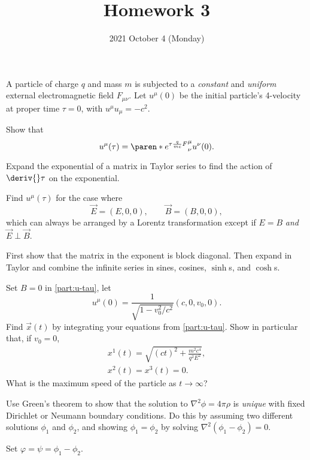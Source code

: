 \documentclass{phys151}
\title{Homework 3}
\date{2021 October 4 (Monday)}
\author{}
\begin{document}
\begin{problem}
  A particle of charge \(q\) and mass \(m\) is subjected to a \emph{constant}
  and \emph{uniform} external electromagnetic field \(F_{\mu \nu}\).  Let
  \(u^\mu(0)\) be the initial particle's 4-velocity at proper time \(\tau =
  0\), with \(u^\mu u_\mu = -c^2\).
  \begin{subproblems}
  \item Show that
    \[
      u^\mu(\tau) = \paren* {e^{\tau \frac q {m c} F}}^\mu_\nu u^\nu(0).
    \]
    \begin{hint}
      Expand the exponential of a matrix in Taylor series to find the action of
      \(\deriv {} \tau\) on the exponential.
    \end{hint}
  \item \label{part:u-tau} Find \(u^\mu(\tau)\) for the case where
    \[
      \vec E = (E, 0, 0), \qquad \vec B = (B, 0, 0),
    \]
    which can always be arranged by a Lorentz transformation except if \(E =
    B\) \emph{and} \(\vec E \perp \vec B\).
    \begin{hint}
      First show that the matrix in the exponent is block diagonal.  Then
      expand in Taylor and combine the infinite series in sines, cosines,
      \(\sinh\)s, and \(\cosh\)s.
    \end{hint}
  \item Set \(B = 0\) in \ref{part:u-tau}, let
    \[
      u^\mu(0) = \frac 1 {\sqrt {1 - v_0^2 / c^2}} (c, 0, v_0, 0).
    \]
    Find \(\vec x(t)\) by integrating your equations from \ref{part:u-tau}.
    Show in particular that, if \(v_0 = 0\),
    \begin{gather*}
      x^1(t) = \sqrt {(ct)^2 + \frac {m^2 c^4} {q^2 E^2}}, \\
      x^2(t) = x^3(t) = 0.
    \end{gather*}
    What is the maximum speed of the particle as \(t \to \infty\)?
  \end{subproblems}
\end{problem}

\begin{solution}

\end{solution}

\begin{problem}
  Use Green's theorem to show that the solution to \(\nabla^2 \phi = 4 \pi
  \rho\) is \emph{unique} with fixed Dirichlet or Neumann boundary conditions.
  Do this by assuming two different solutions \(\phi_1\) and \(\phi_2\), and
  showing \(\phi_1 = \phi_2\) by solving \(\nabla^2 (\phi_1 - \phi_2) = 0\).
  \begin{hint}
    Set \(\varphi = \psi = \phi_1 - \phi_2\).
  \end{hint}
\end{problem}
\end{document}
